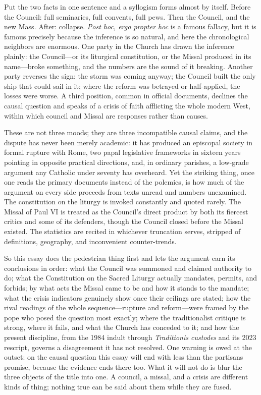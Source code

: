Put the two facts in one sentence and a syllogism forms almost by itself. Before the Council: full seminaries, full convents, full pews. Then the Council, and the new Mass. After: collapse. \emph{Post hoc, ergo propter hoc} is a famous fallacy, but it is famous precisely because the inference is so natural, and here the chronological neighbors are enormous. One party in the Church has drawn the inference plainly: the Council---or its liturgical constitution, or the Missal produced in its name---broke something, and the numbers are the sound of it breaking. Another party reverses the sign: the storm was coming anyway; the Council built the only ship that could sail in it; where the reform was betrayed or half-applied, the losses were worse. A third position, common in official documents, declines the causal question and speaks of a crisis of faith afflicting the whole modern West, within which council and Missal are responses rather than causes.

These are not three moods; they are three incompatible causal claims, and the dispute has never been merely academic: it has produced an episcopal society in formal rupture with Rome, two papal legislative frameworks in sixteen years pointing in opposite practical directions, and, in ordinary parishes, a low-grade argument any Catholic under seventy has overheard. Yet the striking thing, once one reads the primary documents instead of the polemics, is how much of the argument on every side proceeds from texts unread and numbers unexamined. The constitution on the liturgy is invoked constantly and quoted rarely. The Missal of Paul VI is treated as the Council's direct product by both its fiercest critics and some of its defenders, though the Council closed before the Missal existed. The statistics are recited in whichever truncation serves, stripped of definitions, geography, and inconvenient counter-trends.

So this essay does the pedestrian thing first and lets the argument earn its conclusions in order: what the Council was summoned and claimed authority to do; what the Constitution on the Sacred Liturgy actually mandates, permits, and forbids; by what acts the Missal came to be and how it stands to the mandate; what the crisis indicators genuinely show once their ceilings are stated; how the rival readings of the whole sequence---rupture and reform---were framed by the pope who posed the question most exactly; where the traditionalist critique is strong, where it fails, and what the Church has conceded to it; and how the present discipline, from the 1984 indult through \emph{Traditionis custodes} and its 2023 rescript, governs a disagreement it has not resolved. One warning is owed at the outset: on the causal question this essay will end with less than the partisans promise, because the evidence ends there too. What it will not do is blur the three objects of the title into one. A council, a missal, and a crisis are different kinds of thing; nothing true can be said about them while they are fused.
